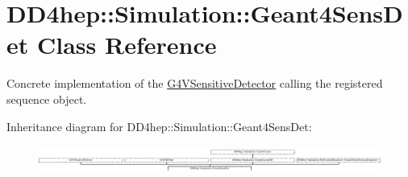 \hypertarget{class_d_d4hep_1_1_simulation_1_1_geant4_sens_det}{}\section{D\+D4hep\+:\+:Simulation\+:\+:Geant4\+Sens\+Det Class Reference}
\label{class_d_d4hep_1_1_simulation_1_1_geant4_sens_det}


Concrete implementation of the \hyperlink{class_g4_v_sensitive_detector}{G4\+V\+Sensitive\+Detector} calling the registered sequence object.  


Inheritance diagram for D\+D4hep\+:\+:Simulation\+:\+:Geant4\+Sens\+Det\+:\begin{figure}[H]
\begin{center}
\leavevmode
\includegraphics[height=0.913043cm]{class_d_d4hep_1_1_simulation_1_1_geant4_sens_det}
\end{center}
\end{figure}
